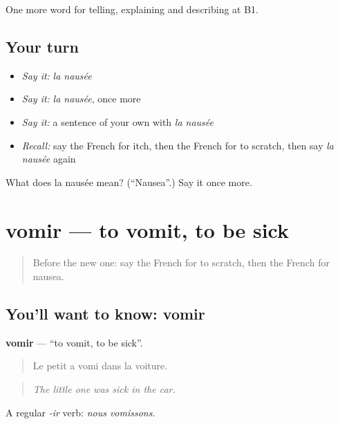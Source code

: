 \begin{grammarlens}[title={What you've built}]
One more word for telling, explaining and describing at B1.
\end{grammarlens}

\subsection*{Your turn}
\begin{itemize}
\raggedright
  \item \emph{Say it:} \emph{la nausée}
  \item \emph{Say it:} \emph{la nausée}, once more
  \item \emph{Say it:} a sentence of your own with \emph{la nausée}
  \item \emph{Recall:} say the French for itch, then the French for to scratch, then say \emph{la nausée} again
\end{itemize}

\begin{tcolorbox}[breakable,colback=teal!4,colframe=teal!35!black,title={Before you move on}]
What does la nausée mean? (\textquotedblleft{}Nausea\textquotedblright{}.) Say it once more.
\end{tcolorbox}
\section[vomir]{vomir — to vomit, to be sick}

\label{lesson:FR-C483-vomir}



\begin{quote}
Before the new one: say the French for to scratch, then the French for nausea.
\end{quote}

\subsection*{You'll want to know: vomir}
\textbf{vomir} — \textquotedblleft{}to vomit, to be sick\textquotedblright{}.

\begin{quote}
Le petit a vomi dans la voiture.
\end{quote}

\begin{quote}
\emph{The little one was sick in the car.}
\end{quote}

A regular \emph{-ir} verb: \emph{nous vomissons}.

